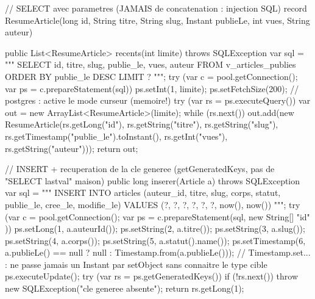 \begin{codejava}
// SELECT avec parametres (JAMAIS de concatenation : injection SQL)
record ResumeArticle(long id, String titre, String slug, Instant publieLe, int vues, String auteur) { }

public List<ResumeArticle> recents(int limite) throws SQLException {
    var sql = """
            SELECT id, titre, slug, publie_le, vues, auteur
            FROM   v_articles_publies
            ORDER  BY publie_le DESC
            LIMIT  ?
            """;
    try (var c = pool.getConnection();
         var ps = c.prepareStatement(sql)) {
        ps.setInt(1, limite);
        ps.setFetchSize(200);                       // postgres : active le mode curseur (memoire!)
        try (var rs = ps.executeQuery()) {
            var out = new ArrayList<ResumeArticle>(limite);
            while (rs.next()) {
                out.add(new ResumeArticle(rs.getLong("id"), rs.getString("titre"), rs.getString("slug"),
                        rs.getTimestamp("publie_le").toInstant(), rs.getInt("vues"), rs.getString("auteur")));
            }
            return out;
        }
    }
}

// INSERT + recuperation de la cle generee (getGeneratedKeys, pas de "SELECT lastval" maison)
public long inserer(Article a) throws SQLException {
    var sql = """
            INSERT INTO articles (auteur_id, titre, slug, corps, statut, publie_le, cree_le, modifie_le)
            VALUES (?, ?, ?, ?, ?, ?, now(), now())
            """;
    try (var c = pool.getConnection();
         var ps = c.prepareStatement(sql, new String[] { "id" })) {
        ps.setLong(1, a.auteurId());
        ps.setString(2, a.titre());
        ps.setString(3, a.slug());
        ps.setString(4, a.corps());
        ps.setString(5, a.statut().name());
        ps.setTimestamp(6, a.publieLe() == null ? null : Timestamp.from(a.publieLe()));
        // Timestamp.set... : ne passe jamais un Instant par setObject sans connaitre le type cible
        ps.executeUpdate();
        try (var rs = ps.getGeneratedKeys()) {
            if (!rs.next()) { throw new SQLException("cle generee absente"); }
            return rs.getLong(1);
        }
    }
}


\end{codejava}
